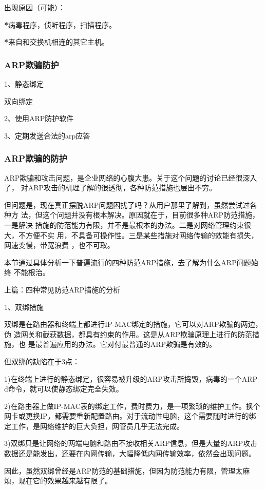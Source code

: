 \documentclass[letterpaper,10pt]{sphinxmanual}
\begin{document}
出现原因（可能）：

{\color{red}\bfseries{}*}病毒程序，侦听程序，扫描程序。

{\color{red}\bfseries{}*}来自和交换机相连的其它主机。


\subsubsection{ARP欺骗防护}
\label{Linux_net/arp:id7}
1、静态绑定

双向绑定

2、使用ARP防护软件

3、定期发送合法的arp应答


\subsubsection{ARP欺骗的防护}
\label{Linux_net/arp:id8}
ARP欺骗和攻击问题，是企业网络的心腹大患。关于这个问题的讨论已经很深入了，
对ARP攻击的机理了解的很透彻，各种防范措施也层出不穷。

但问题是，现在真正摆脱ARP问题困扰了吗？从用户那里了解到，虽然尝试过各种方
法，但这个问题并没有根本解决。原因就在于，目前很多种ARP防范措施，一是解决
措施的防范能力有限，并不是最根本的办法。二是对网络管理约束很大，不方便不实
用，不具备可操作性。三是某些措施对网络传输的效能有损失，网速变慢，带宽浪费
，也不可取。

本节通过具体分析一下普遍流行的四种防范ARP措施，去了解为什么ARP问题始终
不能根治。

上篇：四种常见防范ARP措施的分析

1、双绑措施

双绑是在路由器和终端上都进行IP-MAC绑定的措施，它可以对ARP欺骗的两边，伪
造网关和截获数据，都具有约束的作用。这是从ARP欺骗原理上进行的防范措施，也
是最普遍应用的办法。它对付最普通的ARP欺骗是有效的。

但双绑的缺陷在于3点：

1)在终端上进行的静态绑定，很容易被升级的ARP攻击所捣毁，病毒的一个ARP–d命令，就可以使静态绑定完全失效。

2)在路由器上做IP-MAC表的绑定工作，费时费力，是一项繁琐的维护工作。换个网卡或更换IP，都需要重新配置路由。对于流动性电脑，这个需要随时进行的绑定工作，是网络维护的巨大负担，网管员几乎无法完成。

3)双绑只是让网络的两端电脑和路由不接收相关ARP信息，但是大量的ARP攻击数据还是能发出，还要在内网传输，大幅降低内网传输效率，依然会出现问题。

因此，虽然双绑曾经是ARP防范的基础措施，但因为防范能力有限，管理太麻烦，现在它的效果越来越有限了。
\end{document}
